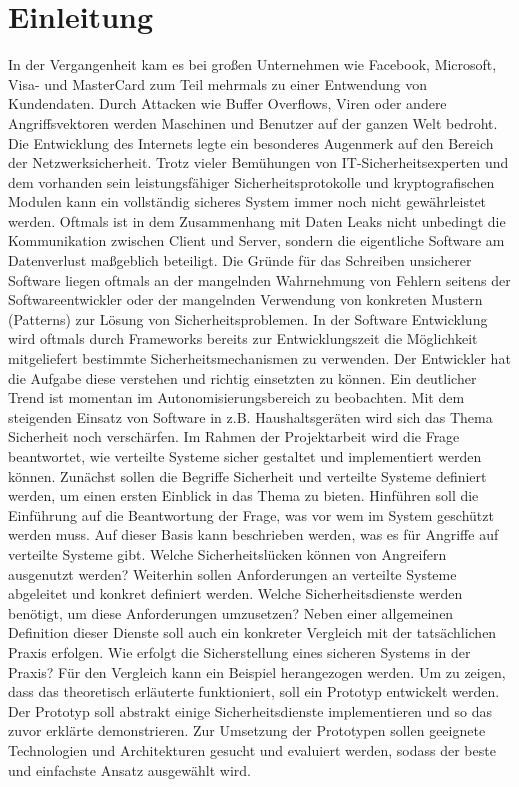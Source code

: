 
\chapter{Einleitung}\label{Einleitung}

In der Vergangenheit kam es bei großen Unternehmen wie Facebook, Microsoft, Visa- und
MasterCard zum Teil mehrmals zu einer Entwendung von Kundendaten. Durch Attacken wie
Buffer Overflows, Viren oder andere Angriffsvektoren werden Maschinen und Benutzer auf
der ganzen Welt bedroht. Die Entwicklung des Internets legte ein besonderes Augenmerk auf
den Bereich der Netzwerksicherheit. Trotz vieler Bemühungen von IT-Sicherheitsexperten
und dem vorhanden sein leistungsfähiger Sicherheitsprotokolle und kryptografischen
Modulen kann ein vollständig sicheres System immer noch nicht gewährleistet werden.
Oftmals ist in dem Zusammenhang mit Daten Leaks nicht unbedingt die Kommunikation
zwischen Client und Server, sondern die eigentliche Software am Datenverlust maßgeblich
beteiligt. Die Gründe für das Schreiben unsicherer Software liegen oftmals an der mangelnden
Wahrnehmung von Fehlern seitens der Softwareentwickler oder der mangelnden
Verwendung von konkreten Mustern (Patterns) zur Lösung von Sicherheitsproblemen. In der
Software Entwicklung wird oftmals durch Frameworks bereits zur Entwicklungszeit die
Möglichkeit mitgeliefert bestimmte Sicherheitsmechanismen zu verwenden. Der Entwickler
hat die Aufgabe diese verstehen und richtig einsetzten zu können. Ein deutlicher Trend ist
momentan im Autonomisierungsbereich zu beobachten. Mit dem steigenden Einsatz von
Software in z.B. Haushaltsgeräten wird sich das Thema Sicherheit noch verschärfen. 
\newline
Im Rahmen der Projektarbeit wird die Frage beantwortet, wie
verteilte Systeme sicher gestaltet und implementiert werden können. 
Zunächst sollen die Begriffe Sicherheit und verteilte Systeme definiert werden, 
um einen ersten Einblick in das Thema zu bieten. 
Hinführen soll die Einführung auf die Beantwortung der Frage, 
was vor wem im System geschützt werden muss. Auf dieser Basis kann beschrieben werden, 
was es für Angriffe auf verteilte Systeme gibt. 
Welche Sicherheitslücken können von Angreifern ausgenutzt werden? 
Weiterhin sollen Anforderungen an verteilte Systeme abgeleitet und konkret definiert werden. 
Welche Sicherheitsdienste werden benötigt, um diese Anforderungen umzusetzen? 
Neben einer allgemeinen Definition dieser Dienste soll auch ein konkreter Vergleich mit der tatsächlichen Praxis erfolgen. 
Wie erfolgt die Sicherstellung eines sicheren Systems in der Praxis? 
Für den Vergleich kann ein Beispiel herangezogen werden. 
Um zu zeigen, dass das theoretisch erläuterte funktioniert, soll ein Prototyp entwickelt werden. 
Der Prototyp soll abstrakt einige Sicherheitsdienste implementieren und so das zuvor erklärte demonstrieren. 
Zur Umsetzung der Prototypen sollen geeignete Technologien und Architekturen gesucht und evaluiert werden, 
sodass der beste und einfachste Ansatz ausgewählt wird.


